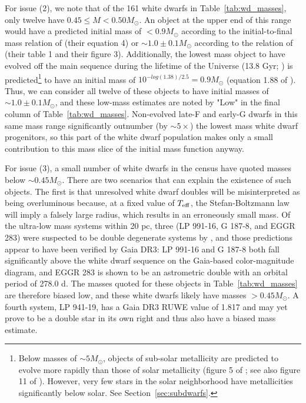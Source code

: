 \documentclass[twocolumn,tighten,twocolappendix]{aastex631}
\begin{document}
For issue (2), we note that of the 161 white dwarfs in Table~\ref{tab:wd_masses}, only twelve have $0.45 \le M < 0.50 M_\odot$. An object at the upper end of this range would have a predicted initial mass of $<0.9 M_\odot$ according to the initial-to-final mass relation of \cite{cummings2018} (their equation 4) or $\sim1.0{\pm}0.1 M_\odot$ according to the relation of \cite{elbadry2018} (their table 1 and their figure 3). Additionally, the lowest mass object to have evolved off the main sequence during the lifetime of the Universe (13.8 Gyr; \citealt{planck2020}) is predicted\footnote{Below masses of $\sim5 M_\odot$, objects of sub-solar metallicity are predicted to evolve more rapidly than those of solar metallicity (figure 5 of \citealt{mowlavi1998}; see also figure 11 of \citealt{mowlavi2012}). However, very few stars in the solar neighborhood have metallicities significantly below solar. See Section~\ref{sec:subdwarfs}.} to have an initial mass of $10^{-log(1.38)/2.5} = 0.9 M_\odot$ (equation 1.88 of \citealt{hansen1994}). Thus, we can consider all twelve of these objects to have initial masses of $\sim1.0{\pm}0.1 M_\odot$, and these low-mass estimates are noted by "Low" in the final column of Table~\ref{tab:wd_masses}. Non-evolved late-F and early-G dwarfs in this same mass range significantly outnumber (by $\sim5\times$) the lowest mass white dwarf progenitors, so this part of the white dwarf population makes only a small contribution to this mass slice of the initial mass function anyway.

For issue (3), a small number of white dwarfs in the census have quoted masses below ${\sim}0.45 M_\odot$. There are two scenarios that can explain the existence of such objects. The first is that unresolved white dwarf doubles will be misinterpreted as being overluminous because, at a fixed value of $T_{\rm eff}$, the Stefan-Boltzmann law will imply a falsely large radius, which results in an erroneously small mass. Of the ultra-low mass systems within 20 pc, three (LP 991-16, G 187-8, and EGGR 283) were suspected to be double degenerate systems by \cite{giammichele2012}, and those predictions appear to have been verified by Gaia DR3: LP 991-16 and G 187-8 both fall significantly above the white dwarf sequence on the Gaia-based color-magnitude diagram, and EGGR 283 is shown to be an astrometric double with an orbital period of 278.0 d. The masses quoted for these objects in Table~\ref{tab:wd_masses} are therefore biased low, and these white dwarfs likely have masses $>0.45 M_\odot$. A fourth system, LP 941-19, has a Gaia DR3 RUWE value of 1.817 and may yet prove to be a double star in its own right and thus also have a biased mass estimate. 
\end{document}
